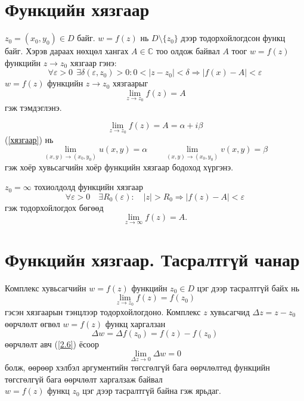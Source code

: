 \section{Функцийн хязгаар} 
\begin{dfn}
    $z_0=(x_0,y_0)\in D$ байг. $w=f(z)$ нь $D\setminus\{z_0\}$ дээр тодорхойлогдсон функц байг. Хэрэв дараах нөхцөл хангах $A\in \mathbb{C}$ тоо олдож байвал $A$ тоог $w=f(z)$ функцийн $z\to z_0$ хязгаар гэнэ:
\begin{equation} \label{хязгаар тэмдэг}
    \forall \varepsilon >0 \ \  \exists \delta (\varepsilon, z_0)>0: 0<|z-z_0|<\delta \Rightarrow |f(x)-A|<\varepsilon 
    \end{equation}
$w=f(z)$ функцийн $z\to z_0$ хязгаарыг 
\begin{equation} \label{хязгаар}
\lim_{z\rightarrow z_0} f(z)=A
\end{equation}
гэж тэмдэглэнэ.
\end{dfn}
\begin{equation} \label{хязгаар}
\lim_{z\rightarrow z_0} f(z)=A=\alpha +i\beta
\end{equation}
 (\ref{хязгаар}) нь
\begin{equation}
\lim_{(x,y)\rightarrow (x_0,y_0)} u(x,y)=\alpha \qquad \lim_{(x,y)\rightarrow (x_0,y_0)} v(x,y)=\beta
\end{equation}
гэж хоёр хувьсагчийн хоёр функцийн хязгаар бодоход хүргэнэ. 

$z_0=\infty$ тохиолдолд функцийн хязгаар
$$\forall \varepsilon >0 \quad \exists R_0(\varepsilon): \quad |z|>R_0\Rightarrow |f(z)-A|<\varepsilon$$
гэж тодорхойлогдох бөгөөд
\begin{equation}
\lim_{z\rightarrow \infty} f(z)=A.
\end{equation}
\section{Функцийн хязгаар. Тасралтгүй чанар} 
Комплекс хувьсагчийн $w=f(z)$ функцийн $z_0\in D$ цэг дээр тасралтгүй байх нь
\begin{equation} \label{2.6}
\lim_{z\rightarrow z_0} f(z)=f(z_0)
\end{equation}
гэсэн хязгаарын тэнцлээр тодорхойлогдоно. Комплекс $z$ хувьсагчид $\Delta z=z-z_0$ өөрчлөлт өгвөл $w=f(z)$ функц харгалзан
$$\Delta w= \Delta f(z_0)=f(z)-f(z_0)$$
өөрчлөлт авч (\ref{2.6}) ёсоор
\begin{equation}
\lim_{\Delta z\rightarrow 0} \Delta w =0
\end{equation}
болж, өөрөөр хэлбэл аргументийн төгсгөлгүй бага өөрчлөлтөд функцийн төгсгөлгүй бага өөрчлөлт харгалзаж байвал\\ $w=f(z)$ функц $z_0$ цэг дээр тасралтгүй байна гэж ярьдаг.

